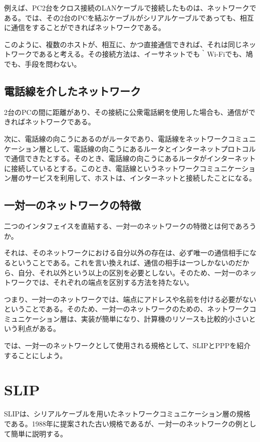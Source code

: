 例えば、PC2台をクロス接続のLANケーブルで接続したものは、ネットワークである。では、その2台のPCを結ぶケーブルがシリアルケーブルであっても、相互に通信をすることができればネットワークである。

このように、複数のホストが、相互に、かつ直接通信できれば、それは同じネットワークであると考える。その接続方法は、イーサネットでも｀Wi-Fiでも、鳩でも、手段を問わない。


\subsection{電話線を介したネットワーク}
2台のPCの間に距離があり、その接続に公衆電話網を使用した場合も、通信ができればネットワークである。

次に、電話線の向こうにあるのがルータであり、電話線をネットワークコミュニケーション層として、電話線の向こうにあるルータとインターネットプロトコルで通信できたとする。そのとき、電話線の向こうにあるルータがインターネットに接続しているとする。このとき、電話線というネットワークコミュニケーション層のサービスを利用して、ホストは、インターネットと接続したことになる。


\subsection{一対一のネットワークの特徴}
二つのインタフェイスを直結する、一対一のネットワークの特徴とは何であろうか。

それは、そのネットワークにおける自分以外の存在は、必ず唯一の通信相手になるということである。これを言い換えれば、通信の相手は一つしかないのだから、自分、それ以外という以上の区別を必要としない。そのため、一対一のネットワークでは、それぞれの端点を区別する方法を持たない。

つまり、一対一のネットワークでは、端点にアドレスや名前を付ける必要がないということである。そのため、一対一のネットワークのための、ネットワークコミュニケーション層は、実装が簡単になり、計算機のリソースも比較的小さいという利点がある。

では、一対一のネットワークとして使用される規格として、SLIPとPPPを紹介することにしよう。

\section{SLIP}

SLIPは、シリアルケーブルを用いたネットワークコミュニケーション層の規格である。1988年に提案された古い規格であるが、一対一のネットワークの例として簡単に説明する。

